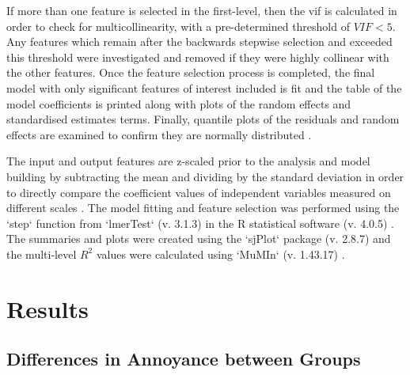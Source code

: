 If more than one feature is selected in the first-level, then the \gls{vif} is calculated in order to check for multicollinearity, with a pre-determined threshold of $VIF<5$. Any features which remain after the backwards stepwise selection and exceeded this threshold were investigated and removed if they were highly collinear with the other features. Once the feature selection process is completed, the final model with only significant features of interest included is fit and the table of the model coefficients is printed along with plots of the random effects and standardised estimates terms. Finally, quantile plots of the residuals and random effects are examined to confirm they are normally distributed .

The input and output features are z-scaled prior to the analysis and model building by subtracting the mean and dividing by the standard deviation in order to directly compare the coefficient values of independent variables measured on different scales . The model fitting and feature selection was performed using the `step` function from `lmerTest` (v. 3.1.3)  in the R statistical software (v. 4.0.5) . The summaries and plots were created using the `sjPlot` package (v. 2.8.7)  and the multi-level $R^2$ values were calculated using `MuMIn` (v. 1.43.17) .


\section{Results}

\subsection{Differences in Annoyance between Groups}

